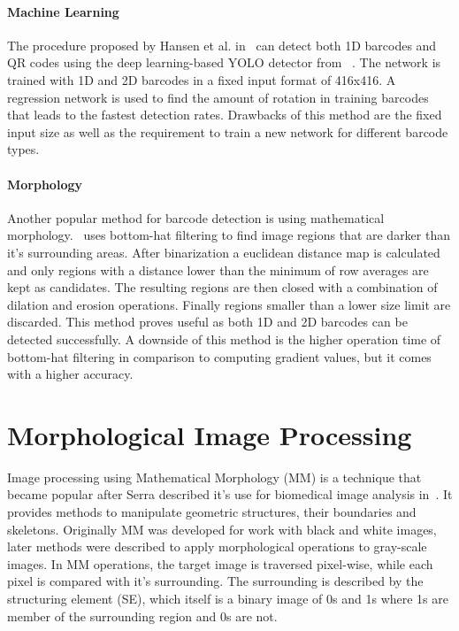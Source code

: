 \documentclass[runningheads,a4paper]{llncs}
\begin{document}
\paragraph{Machine Learning}
The procedure proposed by Hansen et al. in~\cite{hansen2017real} can detect both
1D barcodes and QR codes using the deep learning-based YOLO detector from
~\cite{redmon2017yolo9000}. The network is trained with 1D and 2D barcodes in a
fixed input format of 416x416. A regression network is used to find the amount
of rotation in training barcodes that leads to the fastest detection rates.
Drawbacks of this method are the fixed input size as well as the requirement to
train a new network for different barcode types.

\paragraph{Morphology}
Another popular method for barcode detection is using mathematical
morphology.~\cite{katona2013efficient} uses bottom-hat filtering to find image
regions that are darker than it's surrounding areas. After binarization a
euclidean distance map is calculated and only regions with a distance lower than the
minimum of row averages are kept as candidates. The resulting regions are then
closed with a combination of dilation and erosion operations. Finally regions
smaller than a lower size limit are discarded. This method proves useful as both
1D and 2D barcodes can be detected successfully. A downside of this method is
the higher operation time of bottom-hat filtering in comparison to computing
gradient values, but it comes with a higher accuracy.

\section{Morphological Image Processing}
\label{sec:morph}

Image processing using Mathematical Morphology (MM) is a technique that became
popular after Serra described it's use for biomedical image analysis
in~\cite{serra1979biomedical}. It provides methods to manipulate
geometric structures, their boundaries and skeletons. Originally MM was
developed for work with black and white images, later methods were described to
apply morphological operations to gray-scale images.
In MM operations, the target image is traversed pixel-wise, while each pixel is
compared with it's surrounding. The surrounding is described by the structuring
element (SE), which itself is a binary image of 0s and 1s where 1s
are member of the surrounding region and 0s are not.
\end{document}
